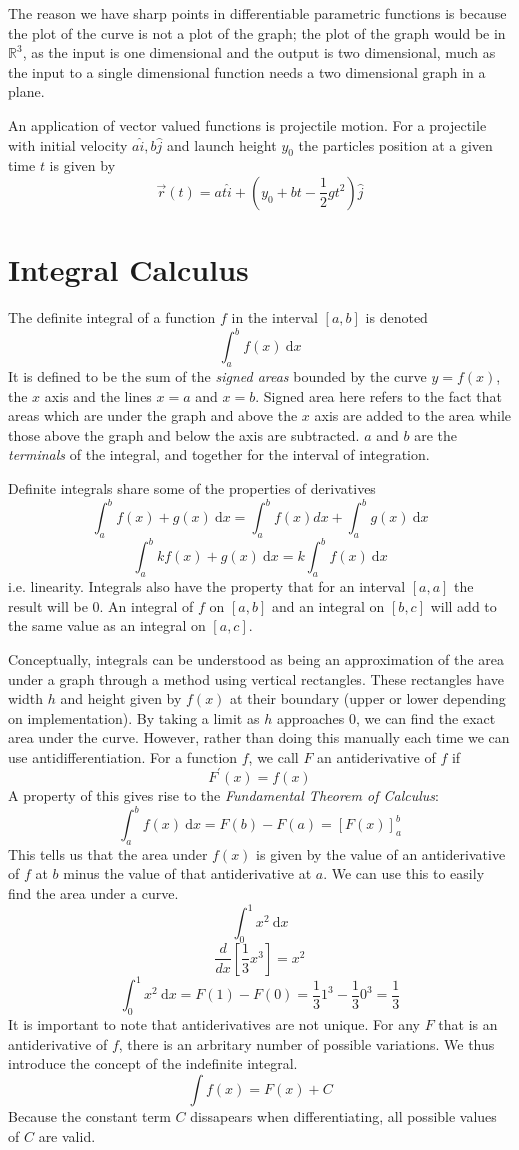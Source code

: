 \documentclass[12pt]{report}
\newcommand{\R}{\mathbb{R}}
\newcommand{\dx}{\:\mathrm{d}x}
\begin{document}
\begin{flushleft}
\bigskip
The reason we have sharp points in differentiable parametric functions is 
because the plot of the curve is not a plot of the graph; the plot of the
graph would be in \(\R^3\), as the input is one dimensional and the output
is two dimensional, much as the input to a single dimensional function needs
a two dimensional graph in a plane.

\bigskip
An application of vector valued functions is projectile motion. For a 
projectile with initial velocity \(a\hat{i}, b\hat{j}\) and launch height 
\(y_0\) the particles position at a given time \(t\) is given by
\[\vec{r}(t) = at\hat{i} + (y_0 + bt - \frac{1}{2}gt^2)\hat{j}\]

\section*{Integral Calculus}
The definite integral of a function \(f\) in the interval \([a, b]\) is
denoted
\[\int_a^b f(x) \dx\]
It is defined to be the sum of the \textit{signed areas} bounded by the curve
\(y = f(x)\), the \(x\) axis and the lines \(x = a\) and \(x = b\). Signed area
here refers to the fact that areas which are under the graph and above the 
\(x\) axis are added to the area while those above the graph and below the axis
are subtracted. \(a\) and \(b\) are the \textit{terminals} of the integral, and
together for the interval of integration.

\bigskip
Definite integrals share some of the properties of derivatives
\[\int_a^b f(x) + g(x) \dx = \int_a^b f(x) dx + \int_a^b g(x) \dx\]
\[\int_a^b kf(x) + g(x) \dx = k\int_a^b f(x) \dx\]
i.e. linearity. Integrals also have the property that for an interval 
\([a, a]\) the result will be \(0\). An integral of \(f\) on \([a, b]\)
and an integral on \([b, c]\) will add to the same value as an integral
on \([a, c]\). 

\bigskip
Conceptually, integrals can be understood as being an approximation of the area
under a graph through a method using vertical rectangles. These rectangles have
width \(h\) and height given by \(f(x)\) at their boundary (upper or lower 
depending on implementation). By taking a limit as \(h\) approaches \(0\), we
can find the exact area under the curve. However, rather than doing this 
manually each time we can use antidifferentiation. For a function \(f\), we
call \(F\) an antiderivative of \(f\) if
\[F^\prime(x) = f(x)\]
A property of this gives rise to the \textit{Fundamental Theorem of Calculus}:
\[\int_a^b f(x) \dx = F(b) - F(a) = [F(x)]_a^b\]
This tells us that the area under \(f(x)\) is given by the value of an 
antiderivative of \(f\) at \(b\) minus the value of that antiderivative at 
\(a\). We can use this to easily find the area under a curve.
\[\int_0^1 x^2 \dx\]
\[\frac{d}{dx}[\frac{1}{3}x^3] = x^2\]
\[\int_0^1 x^2 \dx = F(1) - F(0) = \frac{1}{3}1^3 - \frac{1}{3}0^3=\frac{1}{3}\]
It is important to note that antiderivatives are not unique. For any \(F\) that
is an antiderivative of \(f\), there is an arbritary number of possible 
variations. We thus introduce the concept of the indefinite integral.
\[\int f(x) = F(x) + C\]
Because the constant term \(C\) dissapears when differentiating, all possible
values of \(C\) are valid.


\end{flushleft}
\end{document}
